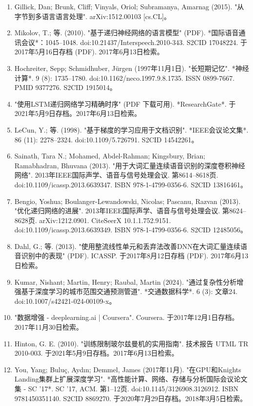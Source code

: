 \begin{enumerate}
\item Gillick, Dan; Brunk, Cliff; Vinyals, Oriol; Subramanya, Amarnag (2015). "从字节到多语言语言处理". arXiv:1512.00103 [cs.CL]。
\item Mikolov, T.; 等. (2010). "基于递归神经网络的语言模型" (PDF). *国际语音通讯会议*：1045–1048. doi:10.21437/Interspeech.2010-343. S2CID 17048224. 于2017年5月16日存档 (PDF). 2017年6月13日检索。
\item Hochreiter, Sepp; Schmidhuber, Jürgen (1997年11月1日). "长短期记忆". *神经计算*. 9 (8): 1735–1780. doi:10.1162/neco.1997.9.8.1735. ISSN 0899-7667. PMID 9377276. S2CID 1915014。
\item "使用LSTM递归网络学习精确时序" (PDF 下载可用). *ResearchGate*. 于2021年5月9日存档。2017年6月13日检索。
\item LeCun, Y.; 等. (1998). "基于梯度的学习应用于文档识别". *IEEE会议论文集*. 86 (11): 2278–2324. doi:10.1109/5.726791. S2CID 14542261。
\item Sainath, Tara N.; Mohamed, Abdel-Rahman; Kingsbury, Brian; Ramabhadran, Bhuvana (2013). "用于大词汇量连续语音识别的深度卷积神经网络". 2013年IEEE国际声学、语音与信号处理会议. 第8614–8618页. doi:10.1109/icassp.2013.6639347. ISBN 978-1-4799-0356-6. S2CID 13816461。
\item Bengio, Yoshua; Boulanger-Lewandowski, Nicolas; Pascanu, Razvan (2013). "优化递归网络的进展". 2013年IEEE国际声学、语音与信号处理会议. 第8624–8628页. arXiv:1212.0901. CiteSeerX 10.1.1.752.9151. doi:10.1109/icassp.2013.6639349. ISBN 978-1-4799-0356-6. S2CID 12485056。
\item Dahl, G.; 等. (2013). "使用整流线性单元和丢弃法改善DNN在大词汇量连续语音识别中的表现" (PDF). ICASSP. 于2017年8月12日存档 (PDF). 2017年6月13日检索。
\item Kumar, Nishant; Martin, Henry; Raubal, Martin (2024). "通过复杂性分析增强基于深度学习的城市范围交通预测管道". *交通数据科学*. 6 (3): 文章24. doi:10.1007/s42421-024-00109-x。
\item "数据增强 - deeplearning.ai | Coursera". Coursera. 于2017年12月1日存档。2017年11月30日检索。
\item Hinton, G. E. (2010). "训练限制玻尔兹曼机的实用指南". 技术报告 UTML TR 2010-003. 于2021年5月9日存档。2017年6月13日检索。
\item You, Yang; Buluç, Aydın; Demmel, James (2017年11月). "在GPU和Knights Landing集群上扩展深度学习". *高性能计算、网络、存储与分析国际会议论文集 - SC '17*. SC '17, ACM. 第1–12页. doi:10.1145/3126908.3126912. ISBN 9781450351140. S2CID 8869270. 于2020年7月29日存档。2018年3月5日检索。

\end{enumerate}
